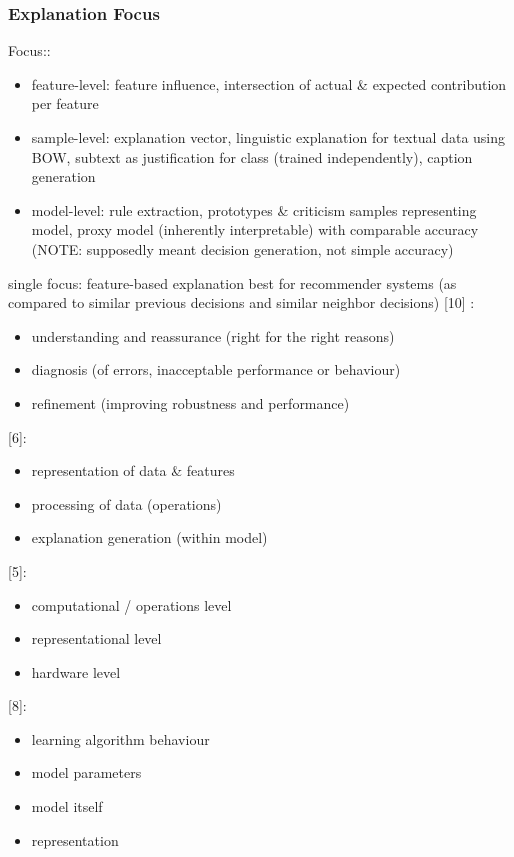 \subsubsection{Explanation Focus}
Focus:\newline
[10]:
\begin{itemize}
	\item feature-level: feature influence, intersection of actual \& expected contribution per feature
	\item sample-level: explanation vector, linguistic explanation for textual data using BOW, subtext as justification for class (trained independently), caption generation 
	\item model-level: rule extraction, prototypes \& criticism samples representing model, proxy model (inherently interpretable) with comparable accuracy (NOTE: supposedly meant decision generation, not simple accuracy)
\end{itemize}
single focus: feature-based explanation best for recommender systems (as compared to similar previous decisions and similar neighbor decisions) [10] \newline
[4]:
\begin{itemize}
	\item understanding and reassurance (right for the right reasons)
	\item diagnosis (of errors, inacceptable performance or behaviour)
	\item refinement (improving robustness and performance)
\end{itemize}
[6]:
\begin{itemize}
	\item representation of data \& features
	\item processing of data (operations)
	\item explanation generation (within model)
\end{itemize}
[5]:
\begin{itemize}
	\item computational / operations level
	\item representational level
	\item hardware level
\end{itemize}
[8]:
\begin{itemize}
	\item learning algorithm behaviour
	\item model parameters
	\item model itself
	\item representation
\end{itemize}
